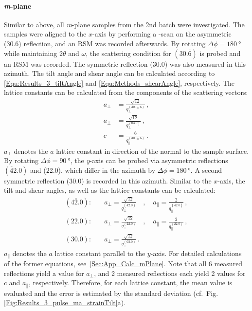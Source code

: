 \paragraph{\textit{m}-plane}
    Similar to above, all \textit{m}-plane samples from the 2nd batch were investigated.
    The samples were aligned to the $x$-axis by performing a \textphi-scan on the asymmetric (30.6) reflection, and an \gls{RSM} was recorded afterwards.
    By rotating $\Delta\phi=\qty{180}{\degree}$ while maintaining $2\theta$ and $\omega$, the scattering condition for $(30.\overline{6})$ is probed and an \gls{RSM} was recorded.
    The symmetric reflection (30.0) was also measured in this azimuth.
    The tilt angle and shear angle can be calculated according to \eqref{Equ:Results_3_tiltAngle} and \eqref{Equ:Methods_shearAngle}, respectively.
    The lattice constants can be calculated from the components of the scattering vectors:
    \begin{align}
        a_\perp &= \frac{\sqrt{12}}{q_\perp^{(30.\pm6)}} \,,\\
        a_\perp &= \frac{\sqrt{12}}{q_\perp^{(03.0)}}\,,\\
        c &= \frac{6}{q_\parallel^{(30.\pm6)}} \,.
    \end{align}
    $a_\perp$ denotes the $a$ lattice constant in direction of the normal to the sample surface.
    By rotating $\Delta\phi=\qty{90}{\degree}$, the \textit{y}-axis can be probed via asymmetric reflections $(\overline{4}2.0)$ and (22.0), which differ in the azimuth by $\Delta\phi=\qty{180}{\degree}$.
    A second symmetric reflection (30.0) is recorded in this azimuth.
    Similar to the $x$-axis, the tilt and shear angles, as well as the lattice constants can be calculated:
    \begin{align}
        (4\overline{2}.0):&\quad
            a_\perp = \frac{\sqrt{12}}{q_\perp^{(4\overline{2}.0)}}
            \quad,\quad
            a_\parallel = \frac{2}{q_\parallel^{(4\overline{2}.0)}}\,,\\
        (22.0):&\quad
            a_\perp = \frac{\sqrt{12}}{q_\perp^{(22.0)}}
            \quad,\quad
            a_\parallel = \frac{2}{q_\parallel^{(22.0)}}\,,\\
        (30.0):&\quad
            a_\perp = \frac{\sqrt{12}}{q_\perp^{(03.0)}}\,.
    \end{align}
    $a_\parallel$ denotes the $a$ lattice constant parallel to the $y$-axis.
    For detailed calculations of the former equations, see\ \ref{Sec:App_Calc_mPlane}.
    Note that all 6 measured reflections yield a value for $a_\perp$, and 2 measured reflections each yield 2 values for $c$ and $a_\parallel$, respectively.
    Therefore, for each lattice constant, the mean value is evaluated and the error is estimated by the standard deviation (cf.\ Fig.\,\ref{Fig:Results_3_pulse_ma_strainTilt}a).
